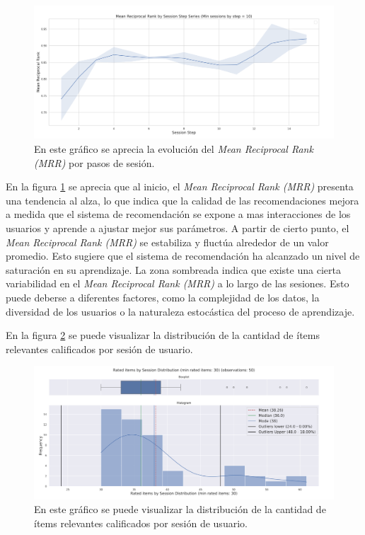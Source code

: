 \documentclass[11pt,a4paper,twoside]{thesis}
\begin{document}
\begin{figure}[H]
	\centering
	\includegraphics[width=15cm]{./images/llama3/mean_reciprocal_rank_by_session_step_series.png}
	\caption{En este gráfico se aprecia la evolución del \textit{Mean Reciprocal Rank (MRR)} por pasos de sesión.}
	\label{fig:llama3-mean_reciprocal_rank_by_session_step_series}
\end{figure}

En la figura \ref{fig:llama3-mean_reciprocal_rank_by_session_step_series} se aprecia que al inicio, el \textit{Mean Reciprocal Rank (MRR)} presenta una tendencia al alza, lo que indica que la calidad de las recomendaciones mejora a medida que el sistema de recomendación se expone a mas interacciones de los usuarios y aprende a ajustar mejor sus parámetros. A partir de cierto punto, el  \textit{Mean Reciprocal Rank (MRR)} se estabiliza y fluctúa alrededor de un valor promedio. Esto sugiere que el sistema de recomendación ha alcanzado un nivel de saturación en su aprendizaje. La zona sombreada indica que existe una cierta variabilidad en el \textit{Mean Reciprocal Rank (MRR)} a lo largo de las sesiones. Esto puede deberse a diferentes factores, como la complejidad de los datos, la diversidad de los usuarios o la naturaleza estocástica del proceso de aprendizaje.


\clearpage

En la figura \ref{fig:llama3-rated_items_by_session_distribution} se puede visualizar la distribución de la cantidad de ítems relevantes calificados por sesión de usuario.


\begin{figure}[H]
	\centering
	\includegraphics[width=15cm]{./images/llama3/rated_items_by_session_distribution.png}
	\caption{En este gráfico se puede visualizar la distribución de la cantidad de ítems relevantes calificados por sesión de usuario.}
	\label{fig:llama3-rated_items_by_session_distribution}
\end{figure}
\end{document}
